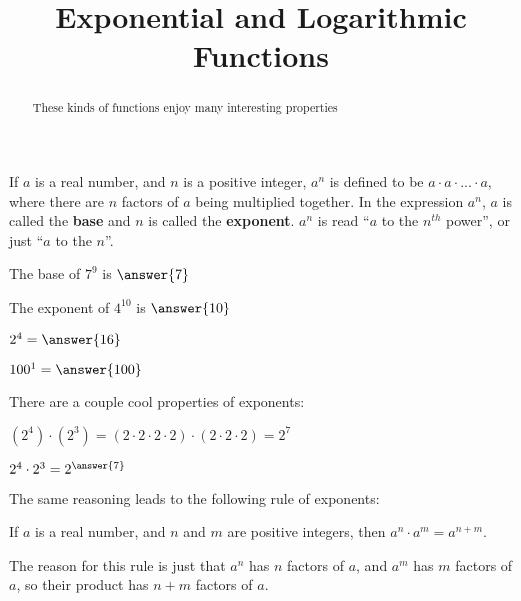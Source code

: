 \documentclass{ximera}
\title{Exponential and Logarithmic Functions}
\begin{document}
\begin{abstract}
	These kinds of functions enjoy many interesting properties
\end{abstract}

\maketitle

\begin{definition}
	If $a$ is a real number, and $n$ is a positive integer, $a^n$ is defined to be $a \cdot a \cdot ... \cdot a$, where there are $n$ factors of $a$ being multiplied together.  In the expression $a^n$, $a$ is called the \textbf{base} and $n$ is called the \textbf{exponent}.  $a^n$ is read ``$a$ to the $n^{th}$ power'', or just ``$a$ to the $n$''.
\end{definition}

\begin{question}
	The base of $7^9$ is $\answer{7}$
\end{question}

\begin{question}
	The exponent of $4^{10}$ is $\answer{10}$
\end{question}

\begin{question}
	$2^4 = \answer{16}$
\end{question}

\begin{question}
	$100^1= \answer{100}$
\end{question}

There are a couple cool properties of exponents:

\begin{question}
	\begin{hint}
		$(2^4) \cdot (2^3) = (2 \cdot 2\cdot 2 \cdot 2) \cdot  (2 \cdot 2\cdot 2) = 2^7 $
	\end{hint}

	$2^4 \cdot 2^3 = 2^{\answer{7}}$
\end{question}

The same reasoning leads to the following rule of exponents:

\begin{theorem}
	If $a$ is a real number, and $n$ and $m$ are positive integers, then $a^n \cdot a^m = a^{n+m}$.
\end{theorem}

The reason for this rule is just that $a^n$ has $n$ factors of $a$, and $a^m$ has $m$ factors of $a$, so their product has $n+m$ factors of $a$.
\end{document}
